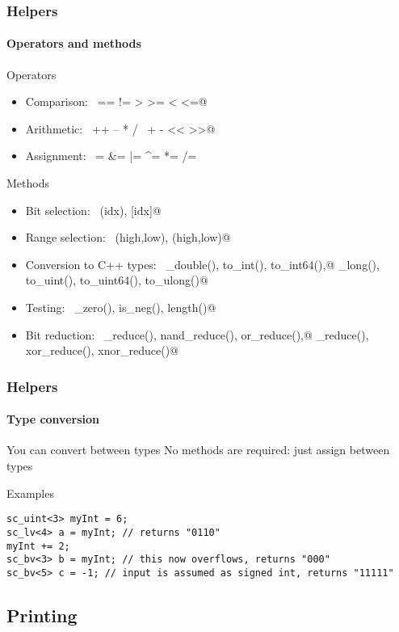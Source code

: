 \begin{frame}[fragile]
\frametitle{Helpers}
\framesubtitle{Operators and methods}
{\scriptsize 
\begin{block}{Operators}
\begin{itemize}
\item Comparison: \, \verb@== != > >= < <=@
\item Arithmetic: \, \verb@++ -- * / \ + - << >>@
\item Assignment: \, \verb@= &= |= ^=  *= /= %= += -= <<= >>=@
\end{itemize}
\end{block}
\pause
\begin{block}{Methods}
\begin{itemize}
\item Bit selection: \, \verb@bit(idx), [idx]@
\item Range selection: \, \verb@range(high,low), (high,low)@
\item Conversion to C++ types: \, \verb@to_double(), to_int(), to_int64(),@ \verb@to_long(), to_uint(), to_uint64(), to_ulong()@
\item Testing: \, \verb@is_zero(), is_neg(), length()@
\item Bit reduction: \, \verb@and_reduce(), nand_reduce(), or_reduce(),@ \verb@nor_reduce(), xor_reduce(), xnor_reduce()@
\end{itemize}
\end{block}
}
\end{frame}

\begin{frame}[fragile]
\frametitle{Helpers}
\framesubtitle{Type conversion}
{\scriptsize 
\begin{block}{You can convert between types}
No methods are required: just assign between types
\end{block}
\pause
\begin{block}{Examples}
\vspace{-1em}
\begin{verbatim}
sc_uint<3> myInt = 6;
sc_lv<4> a = myInt; // returns "0110"
myInt += 2;
sc_bv<3> b = myInt; // this now overflows, returns "000"
sc_bv<5> c = -1; // input is assumed as signed int, returns "11111" 
\end{verbatim}
\vspace{-1em}
\end{block}
}
\end{frame}

\subsection{Printing}

